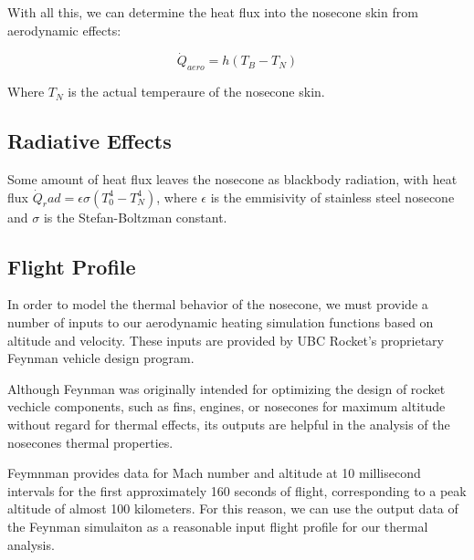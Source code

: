 \documentclass[twocolumn]{article}
\begin{document}
            With all this, we can determine the heat flux into the nosecone skin
            from aerodynamic effects:

            \begin{equation}
                \dot{Q}_{aero}= h(T_B-T_N)
            \end{equation}

            Where $T_N$ is the actual temperaure of the nosecone skin.

        \subsection{Radiative Effects}
            Some amount of heat flux leaves the nosecone as blackbody radiation,
            with heat flux $\dot{Q}_rad=\epsilon\sigma(T_0^4-T_N^4)$, where
            $\epsilon$ is the emmisivity of stainless steel nosecone and 
            $\sigma$ is the Stefan-Boltzman constant.


        \subsection{Flight Profile}
            In order to model the thermal behavior of the nosecone, we must
            provide a number of inputs to our aerodynamic heating simulation 
            functions based on altitude and velocity. These inputs are provided 
            by UBC Rocket's proprietary Feynman vehicle design program.
            
            Although Feynman was originally intended for optimizing the design
            of rocket vechicle components, such as fins, engines, or nosecones 
            for maximum altitude without regard for thermal effects, its outputs
            are helpful in the analysis of the nosecones thermal properties. 

            Feymnman provides data for Mach number and altitude at 10
            millisecond intervals for the first approximately 160 seconds of
            flight, corresponding to a peak altitude of almost 100 kilometers. 
            For this reason, we can use the output data of the Feynman
            simulaiton as a reasonable input flight profile for our thermal
            analysis.
\end{document}
